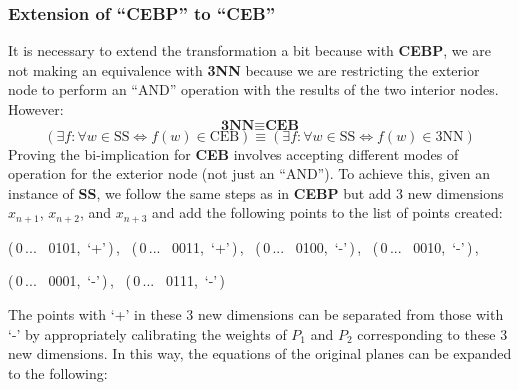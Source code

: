\documentclass[../main]{subfiles}
\begin{document}
\subsubsection{Extension of ``CEBP'' to ``CEB''}
It is necessary to extend the transformation a bit because with \textbf{CEBP}, we are not making an equivalence with \textbf{3NN} because we are restricting the exterior node to perform an ``AND'' operation with the results of the two interior nodes. However:
\begin{equation*}
    \textbf{3NN} \equiv \textbf{CEB}
\end{equation*}
\begin{equation*}
(\exists f : \forall w \in \text{SS} \Longleftrightarrow f(w) \in \text{CEB}) \equiv (\exists f : \forall w \in \text{SS} \Longleftrightarrow f(w) \in \text{3NN})
\end{equation*}
Proving the bi-implication for \textbf{CEB} involves accepting different modes of operation for the exterior node (not just an ``AND''). To achieve this, given an instance of \textbf{SS}, we follow the same steps as in \textbf{CEBP} but add 3 new dimensions $x_{n+1}$, $x_{n+2}$, and $x_{n+3}$ and add the following points to the list of points created:
\begin{center}
    (\,0\,... \, 0101,\, `+'\,)\,, \ (\,0\,... \, 0011,\, `+'\,)\,, \ (\,0\,... \, 0100,\, `-'\,)\,, \ (\,0\,... \, 0010,\, `-'\,)\,, \
    
    (\,0\,... \, 0001,\, `-'\,)\,, \ (\,0\,... \, 0111,\, `-'\,)
\end{center}
The points with `+' in these 3 new dimensions can be separated from those with `-' by appropriately calibrating the weights of $P_1$ and $P_2$ corresponding to these 3 new dimensions. In this way, the equations of the original planes can be expanded to the following:
\end{document}
